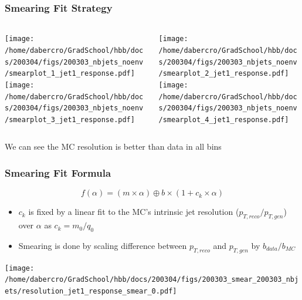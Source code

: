 \documentclass{beamer}
\begin{document}
\begin{frame}
  \frametitle{Smearing Fit Strategy}

  \begin{columns}
    \begin{column}{0.3\linewidth}
      \centering
      \texttt{[image: /home/dabercro/GradSchool/hbb/docs/200304/figs/200303\_nbjets\_noenv/smearplot\_1\_jet1\_response.pdf]} \\
      \texttt{[image: /home/dabercro/GradSchool/hbb/docs/200304/figs/200303\_nbjets\_noenv/smearplot\_3\_jet1\_response.pdf]}
    \end{column}
    \begin{column}{0.3\linewidth}
      \centering
      \texttt{[image: /home/dabercro/GradSchool/hbb/docs/200304/figs/200303\_nbjets\_noenv/smearplot\_2\_jet1\_response.pdf]} \\
      \texttt{[image: /home/dabercro/GradSchool/hbb/docs/200304/figs/200303\_nbjets\_noenv/smearplot\_4\_jet1\_response.pdf]}
    \end{column}
  \end{columns}

  \vfill
  We can see the MC resolution is better than data in all bins

\end{frame}


\begin{frame}
  \frametitle{Smearing Fit Formula}

  \[
  f(\alpha) = (m \times \alpha) \oplus b \times (1 + c_k \times \alpha)
  \]

  \begin{itemize}
  \item $c_k$ is fixed by a linear fit to the MC's intrinsic jet resolution ($p_{T, reco}/p_{T, gen}$) over $\alpha$ as $c_k = m_0/q_0$
  \item Smearing is done by scaling difference between $p_{T,reco}$ and $p_{T,gen}$ by $b_{data}/b_{MC}$
  \end{itemize}

  \centering
  \texttt{[image: /home/dabercro/GradSchool/hbb/docs/200304/figs/200303\_smear\_200303\_nbjets/resolution\_jet1\_response\_smear\_0.pdf]}

\end{frame}
\end{document}
